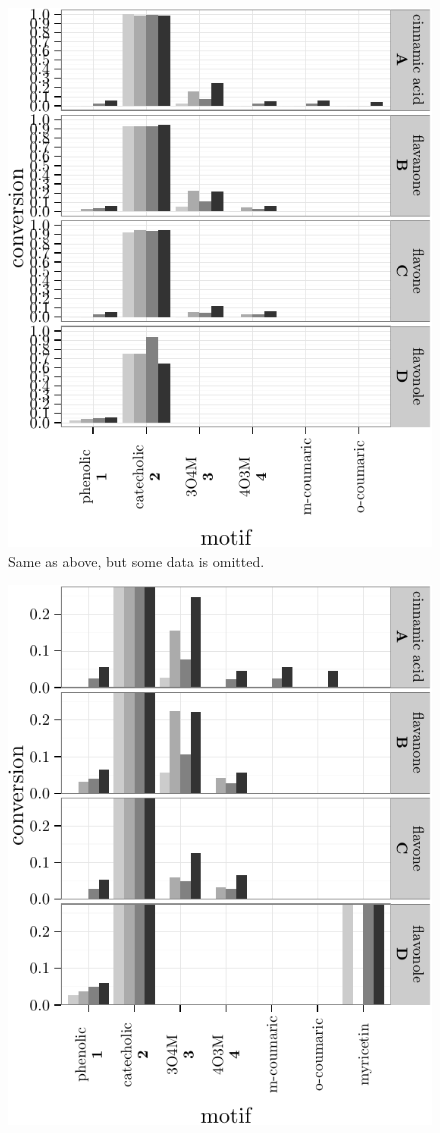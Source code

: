 \documentclass[]{tufte-handout}
\begin{document}
\begin{figure}
 \includegraphics{tufte_files/figure-latex/unnamed-chunk-15-2.pdf}
\caption{Same as above, but some data is omitted.}
\end{figure}\begin{figure}
 \includegraphics{tufte_files/figure-latex/unnamed-chunk-15-3.pdf}

\end{figure}
\end{document}
